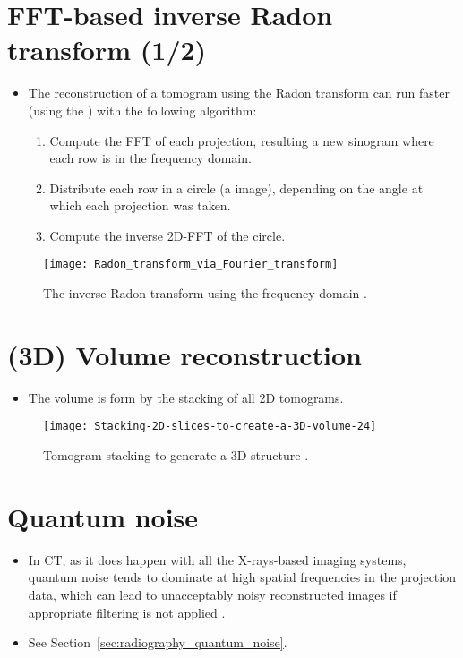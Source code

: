 \section{FFT-based inverse Radon transform (1/2)}
\begin{itemize}
\item The reconstruction of a tomogram using the Radon transform can
  run faster (using the ) with the following algorithm:
  \begin{enumerate}
  \item Compute the FFT of each projection, resulting a new sinogram
    where each row is in the frequency domain.
  \item Distribute each row in a circle (a image), depending on the
    angle at which each projection was taken.
  \item Compute the inverse 2D-FFT of the circle.
  \end{enumerate}
\end{itemize}
\vspace{-4ex}
\begin{figure}[!b]
  \centering
  \texttt{[image: Radon\_transform\_via\_Fourier\_transform]}
  \caption{The inverse Radon transform using the frequency domain
    \cite{wikipedia2025radom_transform}.\label{fig:inverse_Radon}}
\end{figure}

\section{(3D) Volume reconstruction}
\begin{itemize}
\item The volume is form by the stacking of all 2D tomograms.
\end{itemize}
\vspace{-4ex}
\begin{figure}[!b]
  \centering
  \texttt{[image: Stacking-2D-slices-to-create-a-3D-volume-24]}
  \caption{Tomogram stacking to generate a 3D structure
    \cite{alzu2019multi}.\label{fig:stacking}}
\end{figure}

\section{Quantum noise}
\begin{itemize}
\item In CT, as it does happen with all the X-rays-based imaging
  systems, quantum noise tends to dominate at high spatial frequencies
  in the projection data, which can lead to unacceptably noisy
  reconstructed images if appropriate filtering is not applied
  \cite{bushberg2011essential}.
\item See Section~\ref{sec:radiography_quantum_noise}.
\end{itemize}
